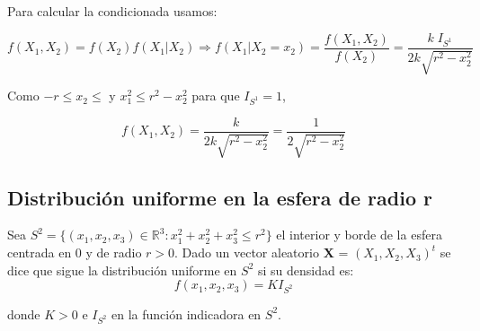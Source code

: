 \documentclass{article}
\theoremstyle{theorem-style}  %
\theoremstyle{definition}
\theoremstyle{example-style}
\begin{document}
\begin{itemize}
		Para calcular la condicionada usamos:
		
		$$f(X_1,X_2) = f(X_2)f(X_1|X_2)\Rightarrow f(X_1|X_2=x_2) = \frac{f(X_1,X_2)}{f(X_2)} = \frac{k\;I_{S^1}}{2k\sqrt{r^2-x_2^2}}$$
		
		Como $-r\leq x_2\leq$ y $x_1^2\leq r^2-x_2^2$ para que $I_{S^1}=1$,
		
		$$f(X_1,X_2)= \frac{k}{2k\sqrt{r^2-x_2^2}} = \frac{1}{2\sqrt{r^2-x_2^2}}$$
		
		
		 
	\end{itemize} 
	
	
	\subsection{Distribución uniforme en la esfera de radio r}
	
	Sea $S^2=\{(x_1, x_2, x_3) \in  \mathbb{R}^3: x_1^2 + x_2^2+x_3^2\leq r^2\}$ el interior y borde de la esfera centrada en 0 y de radio $r>0$. Dado un vector aleatorio \textbf{X} = $(X_1, X_2, X_3)^t$ se dice que sigue la distribución uniforme en $S^2$ si su densidad es:
	$$ f(x_1, x_2, x_3)= KI_{S^2}$$
	
	donde $K>0$ e $I_{S^2}$ en la función indicadora en $S^2$. 
	
\end{document}
